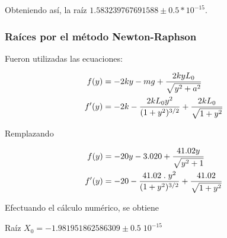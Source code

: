 \documentclass[10pt,a4paper]{article}
\begin{document}
Obteniendo así, la raíz $1.583239767691588 \pm 0.5*10^{-15}$.

\subsubsection{Raíces por el método Newton-Raphson}
Fueron utilizadas las ecuaciones:

\begin{equation}
\begin{aligned}
\notag f(y)&=-2ky - mg +  \dfrac{2kyL_{0}}{\sqrt{y^{2}+a^{2}}}\\
 f'(y)&=-2k-\dfrac{2kL_{0}y^{2}}{(1 + y^{2})^{3/2}} + \dfrac{2kL_{0}}{\sqrt{1 + y^{2}}}
 \end{aligned}
\end{equation}

Remplazando

\begin{equation}
\begin{aligned}
\notag f(y)&=-20y - 3.020 +  \dfrac{41.02y}{\sqrt{y^{2}+1}}\\
 f'(y)&=-20-\dfrac{41.02\;.\;y^{2}}{(1 + y^{2})^{3/2}} + \dfrac{41.02}{\sqrt{1 + y^{2}}}
 \end{aligned}
\end{equation}

Efectuando el cálculo numérico, se obtiene
\begin{table}[H]
\makegapedcells
\centering
{}
\caption{Newton-Rhapson, semilla= -1 }
\end{table}
Raíz $X_{0}=-1.981951862586309 \pm 0.5\;10^{-15}$
\end{document}
